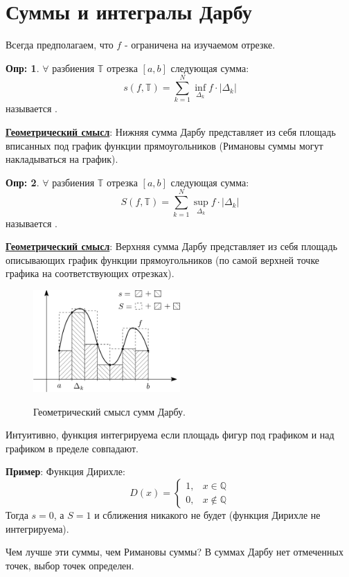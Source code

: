 \documentclass[12pt]{article}
\newcommand{\MQ}{\mathbb{Q}}
\newcommand{\MTB}{\mathbb{T}}
\theoremstyle{definition}
\newtheorem{defn}{Опр:}
\begin{document}
\section*{Суммы и интегралы Дарбу}
Всегда предполагаем, что $f$ - ограничена на изучаемом отрезке.
\begin{defn}
	$\forall$ разбиения $\MTB$ отрезка $[a,b]$ следующая сумма:
	$$
		s(f,\MTB) = \sum\limits_{k = 1}^N \inf\limits_{\Delta_k}f{\cdot}|\Delta_k| 
	$$
	называется .
\end{defn}
\textbf{\uline{Геометрический смысл}}: Нижняя сумма Дарбу представляет из себя площадь вписанных под график функции прямоугольников (Римановы суммы могут накладываться на график).
\begin{defn}
	$\forall$ разбиения $\MTB$ отрезка $[a,b]$ следующая сумма:
	$$
		S(f,\MTB) = \sum\limits_{k = 1}^N \sup\limits_{\Delta_k}f{\cdot}|\Delta_k| 
	$$
	называется .
\end{defn}
\textbf{\uline{Геометрический смысл}}: Верхняя сумма Дарбу представляет из себя площадь описывающих график функции прямоугольников (по самой верхней точке графика на соответствующих отрезках).

\begin{figure}[H]
	\centering
	\includegraphics[width=0.5\textwidth]{23_1.png}
	\label{23_1}
	\caption{Геометрический смысл сумм Дарбу.}
	\label{fig:Суммы Дарбу}
\end{figure}

Интуитивно, функция интегрируема если площадь фигур под графиком и над графиком в пределе совпадают. 

\textbf{Пример}: Функция Дирихле:
$$
	D(x) = 
	\begin{cases}
		1, & x \in \MQ\\
		0, & x \notin \MQ
	\end{cases}
$$ 
Тогда $s = 0$, а $S = 1$ и сближения никакого не будет (функция Дирихле не интегрируема).

Чем лучше эти суммы, чем Римановы суммы? В суммах Дарбу нет отмеченных точек,  выбор точек определен.
\end{document}
